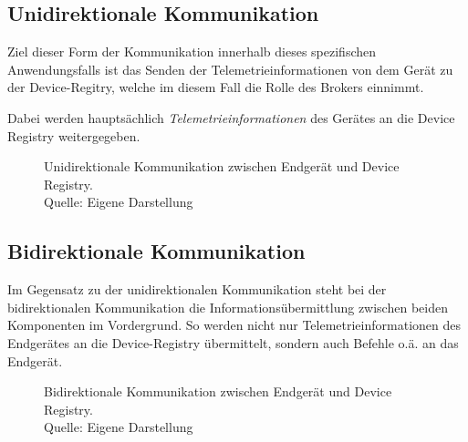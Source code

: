 \subsection*{Unidirektionale Kommunikation}
Ziel dieser Form der Kommunikation innerhalb dieses spezifischen Anwendungsfalls ist das Senden der Telemetrieinformationen von dem Gerät zu der Device-Regitry, welche im diesem Fall die Rolle des Brokers einnimmt.

Dabei werden hauptsächlich \textit{Telemetrieinformationen} des Gerätes an die Device Registry weitergegeben. 

\begin{figure}[h]
    \centering
    \caption[Unidirektionale Kommunikation]{Unidirektionale Kommunikation zwischen Endgerät und Device Registry.\\Quelle: Eigene Darstellung}
\end{figure}

\subsection*{Bidirektionale Kommunikation}
Im Gegensatz zu der unidirektionalen Kommunikation steht bei der bidirektionalen Kommunikation die Informationsübermittlung zwischen beiden Komponenten im Vordergrund. So werden nicht nur Telemetrieinformationen des Endgerätes an die Device-Registry übermittelt, sondern auch Befehle o.ä. an das Endgerät.

\begin{figure}[h]
    \centering
    \caption[Bidirektionale Kommunikation]{Bidirektionale Kommunikation zwischen Endgerät und Device Registry.\\Quelle: Eigene Darstellung}
\end{figure}

